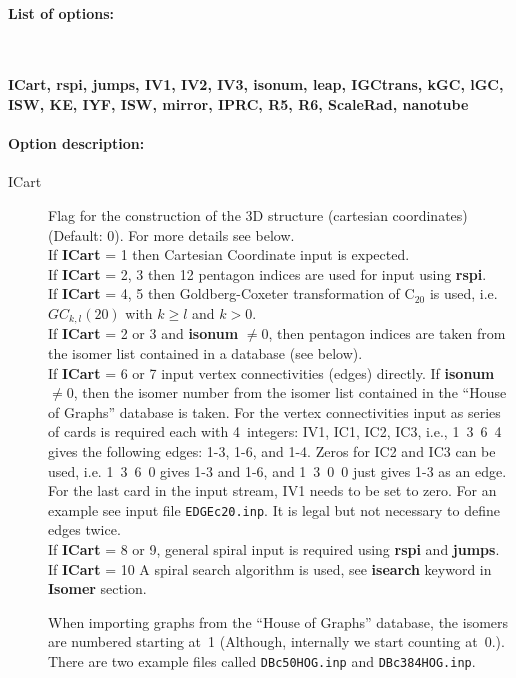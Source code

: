 \documentclass[article,a4paper,twoside]{memoir}
\newcommand{\C}[1]{\ensuremath{\mathrm{C}_{#1}}}
\newcommand{\filename}[1]{\texttt{#1}}
\newcommand{\paramname}[1]{{\color{green}\textbf{#1}}}
\begin{document}
\paragraph{List of options:}\ 

\paramname{ICart, rspi, jumps, IV1, IV2, IV3, isonum, leap, IGCtrans, kGC, lGC, ISW, KE, IYF, ISW, mirror, IPRC, R5, R6, ScaleRad, nanotube}

\paragraph{Option description:} 
\begin{description}
\item[{ICart}] Flag for the construction of the 3D structure (cartesian coordinates) (Default: 0). For more details see below.\\
If \paramname{ICart} = 1 then Cartesian Coordinate input is expected.\\
If \paramname{ICart} = 2, 3 then 12 pentagon indices are used for input using \paramname{rspi}.\\
If \paramname{ICart} = 4, 5 then Goldberg-Coxeter transformation of \C{20} is used, i.e. $GC_{k,l}(20)$ with $k \geq l$ and $k > 0$.\\
If \paramname{ICart} = 2 or 3 and \paramname{isonum} $\neq 0$, then pentagon indices are taken from the
isomer list contained in a database (see below).\\
If \paramname{ICart} = 6 or 7 input vertex connectivities (edges) directly. If \paramname{isonum} $\neq 0$,
then the isomer number from the isomer list contained in the ``House of Graphs'' database is taken. For the
vertex connectivities input as series of cards is required each with 4~integers: IV1, IC1, IC2, IC3,
i.e., 1~3~6~4 gives the following edges: 1-3, 1-6, and 1-4.  Zeros for IC2 and IC3 can be used, i.e. 1~3~6~0
gives 1-3 and 1-6, and 1~3~0~0 just gives 1-3 as an edge.  For the last card in the input stream, IV1 needs
to be set to zero. For an example see input file \filename{EDGEc20.inp}.  It is legal but not necessary to define edges twice.\\
If \paramname{ICart} = 8 or 9, general spiral input is required using  \paramname{rspi} and \paramname{jumps}.\\ 
If \paramname{ICart} = 10 A spiral search algorithm is used, see \paramname{isearch} keyword in \paramname{Isomer} section.

When importing graphs from the ``House of Graphs'' database, the isomers are numbered starting at~1 (Although,
internally we start counting at~0.).  There are two example files called \filename{DBc50HOG.inp} and \filename{DBc384HOG.inp}.


\end{description}
\end{document}
